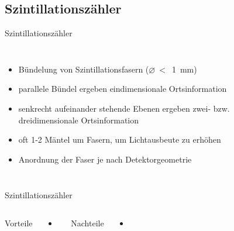 	
\subsection[]{Szintillationszähler}



\begin{frame}{Szintillationszähler}
	\begin{columns}[T]
			\begin{itemize}
			  \item Bündelung von Szintillationsfasern ($\varnothing~<$~1~mm)
			  \item parallele Bündel ergeben eindimensionale Ortsinformation
			  \item senkrecht aufeinander stehende Ebenen ergeben zwei- bzw. dreidimensionale Ortsinformation
			  \item oft 1-2 Mäntel um Fasern, um Lichtausbeute zu erhöhen
			  \item Anordnung der Faser je nach Detektorgeometrie
			\end{itemize}	
	    	\begin{figure}[htbp]
			  \centering
			  
			\end{figure}
    \end{columns}
\end{frame}	
	
	\begin{frame}{Szintillationszähler}
    \begin{columns}[T]
			Vorteile		
			\vspace{0.7cm}
			\begin{itemize}
			  \item 
			\end{itemize}	
	    	Nachteile
	    	\vspace{0.7cm}
	    	\begin{itemize}
			  \item 
			\end{itemize}
    \end{columns}
\end{frame}